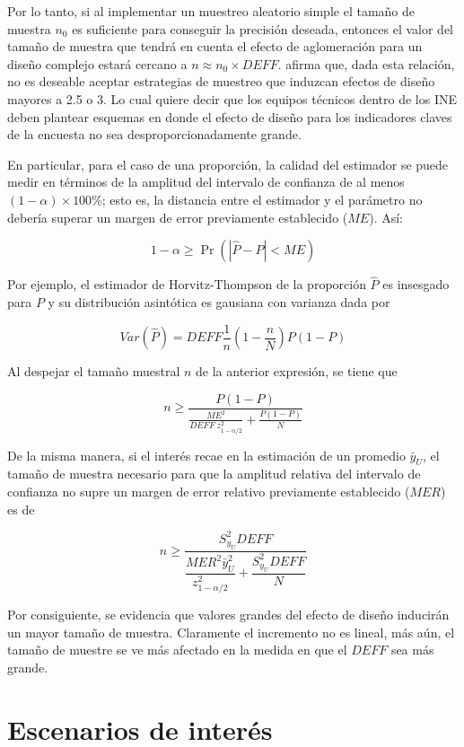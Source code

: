 \documentclass[
  12pt,
  spanish,
]{book}
\begin{document}
Por lo tanto, si al implementar un muestreo aleatorio simple el tamaño de muestra \(n_0\) es suficiente para conseguir la precisión deseada, entonces el valor del tamaño de muestra que tendrá en cuenta el efecto de aglomeración para un diseño complejo estará cercano a \(n \approx n_0 \times DEFF\). \citet{United_Nations_2008} afirma que, dada esta relación, no es deseable aceptar estrategias de muestreo que induzcan efectos de diseño mayores a 2.5 o 3. Lo cual quiere decir que los equipos técnicos dentro de los INE deben plantear esquemas en donde el efecto de diseño para los indicadores claves de la encuesta no sea desproporcionadamente grande.

En particular, para el caso de una proporción, la calidad del estimador se puede medir en términos de la amplitud del intervalo de confianza de al menos \((1-\alpha) \times 100\%\); esto es, la distancia entre el estimador y el parámetro no debería superar un margen de error previamente establecido (\(ME\)). Así:

\[
1-\alpha \geq \Pr\left(|\hat{P}-P|<ME\right)
\]

Por ejemplo, el estimador de Horvitz-Thompson de la proporción \(\hat{P}\) es insesgado para \(P\) y su distribución asintótica es gausiana con varianza dada por

\[
Var\left(\hat{P}\right)=DEFF\frac{1}{n}(1-\frac{n}{N})P(1-P)
\]

Al despejar el tamaño muestral \(n\) de la anterior expresión, se tiene que

\[
n\geq\frac{P(1-P)}{\frac{ME^2}{DEFF \ z_{1-\alpha/2}^2}+\frac{P(1-P)}{N}}
\]

De la misma manera, si el interés recae en la estimación de un promedio \(\bar{y}_U\), el tamaño de muestra necesario para que la amplitud relativa del intervalo de confianza no supre un margen de error relativo previamente establecido (\(MER\)) es de

\[
n \geq \dfrac{S^2_{y_U}DEFF}{\dfrac{MER^2 \bar{y}_U^2}{z_{1-\alpha/2}^2}+\dfrac{S^2_{y_U}DEFF}{N}}
\]

Por consiguiente, se evidencia que valores grandes del efecto de diseño inducirán un mayor tamaño de muestra. Claramente el incremento no es lineal, más aún, el tamaño de muestre se ve más afectado en la medida en que el \(DEFF\) sea más grande.

\hypertarget{escenarios-de-interuxe9s}{%
\section{Escenarios de interés}\label{escenarios-de-interuxe9s}}
\end{document}
